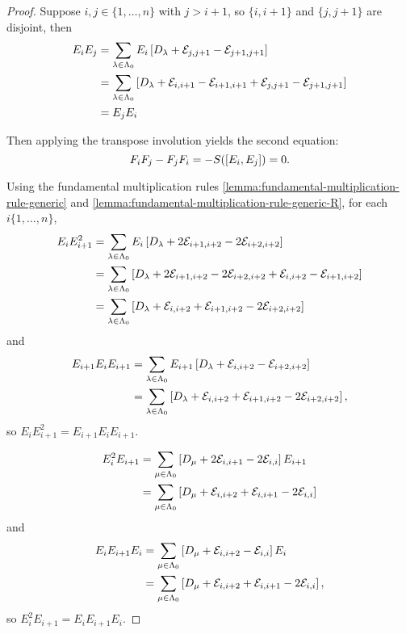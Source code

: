 \documentclass[a4paper, 11pt]{report}
\begin{document}
\begin{proof}
Suppose $i,j\in\{1,\ldots,n\}$ with $j>i+1$, so $\{i,i+1\}$ and $\{j,j+1\}$ are disjoint, then
\begin{align*}
E_iE_j &= \sum_{\lambda\in\Lambda_0{}} E_i\left[ D_{\lambda}+\mathcal{E}_{j,j+1}-\mathcal{E}_{j+1,j+1}\right]\\
&= \sum_{\lambda\in\Lambda_0{}} \left[ D_{\lambda}+\mathcal{E}_{i,i+1}-\mathcal{E}_{i+1,i+1}+\mathcal{E}_{j,j+1}-\mathcal{E}_{j+1,j+1}\right]\\
&= E_jE_i
\end{align*}

Then applying the transpose involution yields the second equation:
\begin{equation*}
F_iF_j-F_jF_i = -S{(\left[E_i,E_j\right])} = 0.
\end{equation*}

Using the fundamental multiplication rules \ref{lemma:fundamental-multiplication-rule-generic} and \ref{lemma:fundamental-multiplication-rule-generic-R}, for each $i\{1,\ldots,n\}$,
\begin{align*}
E_iE_{i+1}^2 &= \sum_{\lambda\in\Lambda_0{}} E_i\left[D_{\lambda} +2\mathcal{E}_{i+1,i+2} -2\mathcal{E}_{i+2,i+2}\right]\\
&= \sum_{\lambda\in\Lambda_0{}} \left[D_{\lambda} +2\mathcal{E}_{i+1,i+2} -2\mathcal{E}_{i+2,i+2} +\mathcal{E}_{i,i+2} -\mathcal{E}_{i+1,i+2}\right]\\
&= \sum_{\lambda\in\Lambda_0{}} \left[D_{\lambda} +\mathcal{E}_{i,i+2} +\mathcal{E}_{i+1,i+2} -2\mathcal{E}_{i+2,i+2}\right]
\end{align*}
and
\begin{align*}
E_{i+1}E_iE_{i+1} &= \sum_{\lambda\in\Lambda_0{}} E_{i+1}\left[D_{\lambda} +\mathcal{E}_{i,i+2}-\mathcal{E}_{i+2,i+2}\right]\\
&= \sum_{\lambda\in\Lambda_0{}} \left[D_{\lambda}+\mathcal{E}_{i,i+2}+\mathcal{E}_{i+1,i+2}-2\mathcal{E}_{i+2,i+2}\right],
\end{align*}
so $E_iE_{i+1}^2 = E_{i+1}E_iE_{i+1}$.

\begin{align*}
E_i^2E_{i+1} &= \sum_{\mu\in\Lambda_0{}} \left[D_{\mu}+2\mathcal{E}_{i,i+1}-2\mathcal{E}_{i,i}\right]E_{i+1}\\
&= \sum_{\mu\in\Lambda_0{}} \left[D_{\mu}+\mathcal{E}_{i,i+2}+\mathcal{E}_{i,i+1}-2\mathcal{E}_{i,i}\right]
\end{align*}
and
\begin{align*}
E_iE_{i+1}E_i &= \sum_{\mu\in\Lambda_0{}} \left[D_{\mu}+\mathcal{E}_{i,i+2}-\mathcal{E}_{i,i}\right]E_i\\
&= \sum_{\mu\in\Lambda_0{}} \left[D_{\mu}+\mathcal{E}_{i,i+2}+\mathcal{E}_{i,i+1}-2\mathcal{E}_{i,i}\right],
\end{align*}
so $E_i^2E_{i+1}=E_iE_{i+1}E_i$.


\end{proof}
\end{document}
